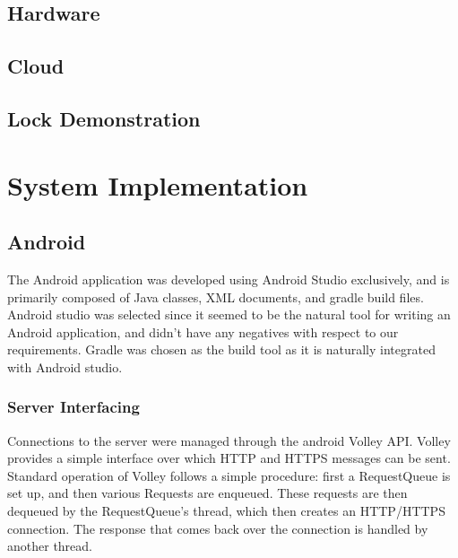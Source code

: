 \documentclass[12pt]{report}
\begin{document}

\section{Hardware}


\section{Cloud}


\section{Lock Demonstration}


\chapter{System Implementation}


\section{Android}

The Android application was developed using Android Studio exclusively, and is primarily composed of Java classes, XML
documents, and gradle build files. Android studio was selected since it seemed to be the natural tool for writing an
Android application, and didn't have any negatives with respect to our requirements. Gradle was chosen as the build
tool as it is naturally integrated with Android studio.

\subsection{Server Interfacing}

Connections to the server were managed through the android Volley API. Volley provides a simple interface over which
HTTP and HTTPS messages can be sent. Standard operation of Volley follows a simple procedure: first a RequestQueue is
set up, and then various Requests are enqueued. These requests are then dequeued by the RequestQueue's thread, which
then creates an HTTP/HTTPS connection. The response that comes back over the connection is handled by another thread.
\end{document}
